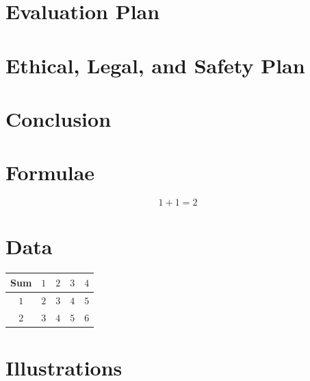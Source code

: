 \documentclass[journal]{IEEEtran}
\begin{document}
\section{Evaluation Plan}

\section{Ethical, Legal, and Safety Plan}

\section{Conclusion}

\newpage
\appendices

\section{Formulae}
$$1 + 1 = 2$$

\section{Data}

\begin{table}[H]
  \centering
  \begin{tabular}{c|cccc}
    Sum             & $1$ & $2$ & $3$ & $4$ \\
    \hline
    $1$             & $2$ & $3$ & $4$ & $5$ \\
    $2$             & $3$ & $4$ & $5$ & $6$ \\
  \end{tabular}
\end{table}

\section{Illustrations}
\end{document}
